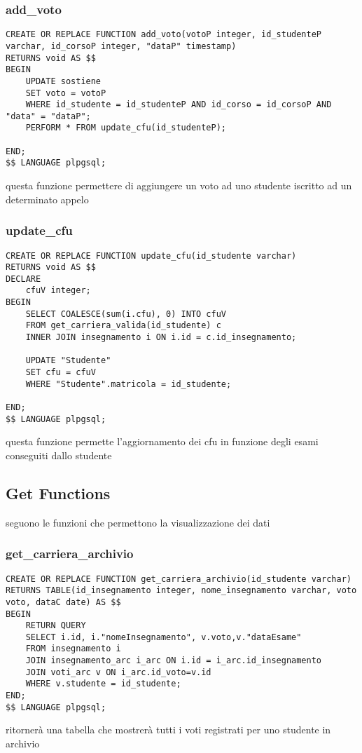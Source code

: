 \subsubsection{add\_voto}\label{addVoto}

\begin{lstlisting}[style=sqlStyle]
CREATE OR REPLACE FUNCTION add_voto(votoP integer, id_studenteP varchar, id_corsoP integer, "dataP" timestamp)
RETURNS void AS $$
BEGIN
	UPDATE sostiene 
	SET voto = votoP
	WHERE id_studente = id_studenteP AND id_corso = id_corsoP AND "data" = "dataP";
	PERFORM * FROM update_cfu(id_studenteP);

END;
$$ LANGUAGE plpgsql;

\end{lstlisting}
questa funzione permettere di aggiungere un voto ad uno studente iscritto ad un determinato appelo 
\subsubsection{update\_cfu}\label{updateCFU}

\begin{lstlisting}[style=sqlStyle]
CREATE OR REPLACE FUNCTION update_cfu(id_studente varchar)
RETURNS void AS $$
DECLARE
    cfuV integer;
BEGIN
    SELECT COALESCE(sum(i.cfu), 0) INTO cfuV
    FROM get_carriera_valida(id_studente) c 
    INNER JOIN insegnamento i ON i.id = c.id_insegnamento;

    UPDATE "Studente" 
    SET cfu = cfuV
    WHERE "Studente".matricola = id_studente;

END;
$$ LANGUAGE plpgsql;
\end{lstlisting}
questa funzione permette l'aggiornamento dei cfu in funzione degli esami conseguiti dallo studente

\subsection{Get Functions}\label{getFunctions}
seguono le funzioni che permettono la visualizzazione dei dati  
\subsubsection{get\_carriera\_archivio}
\begin{lstlisting}[style=sqlStyle]
CREATE OR REPLACE FUNCTION get_carriera_archivio(id_studente varchar)
RETURNS TABLE(id_insegnamento integer, nome_insegnamento varchar, voto voto, dataC date) AS $$
BEGIN
	RETURN QUERY
	SELECT i.id, i."nomeInsegnamento", v.voto,v."dataEsame"
	FROM insegnamento i
	JOIN insegnamento_arc i_arc ON i.id = i_arc.id_insegnamento
	JOIN voti_arc v ON i_arc.id_voto=v.id
	WHERE v.studente = id_studente;
END;
$$ LANGUAGE plpgsql;
\end{lstlisting}
ritornerà una tabella che mostrerà tutti i voti registrati per uno studente in archivio
